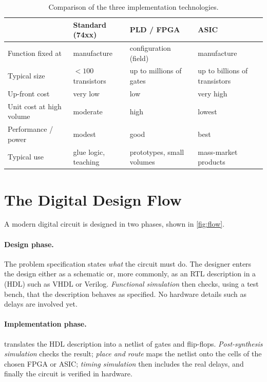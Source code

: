 \begin{table}[htbp]
\centering
\small
\caption{Comparison of the three implementation technologies.}
\label{tab:chiptypes}
\begin{tabularx}{\linewidth}{@{}lXXX@{}}
\toprule
 & \textbf{Standard (74xx)} & \textbf{PLD / FPGA} & \textbf{ASIC}\\
\midrule
Function fixed at & manufacture & configuration (field) & manufacture\\
Typical size & $<100$ transistors & up to millions of gates & up to billions of transistors\\
Up-front cost & very low & low & very high\\
Unit cost at high volume & moderate & high & lowest\\
Performance / power & modest & good & best\\
Typical use & glue logic, teaching & prototypes, small volumes & mass-market products\\
\bottomrule
\end{tabularx}
\end{table}

\section{The Digital Design Flow}\label{sec:flow}
A modern digital circuit is designed in two phases, shown in \cref{fig:flow}.

\paragraph{Design phase.} The problem specification states \emph{what} the circuit must do. The designer enters the design either as a schematic or, more commonly, as an RTL description in a  (HDL) such as VHDL or Verilog. \emph{Functional simulation} then checks, using a test bench, that the description behaves as specified. No hardware details such as delays are involved yet.

\paragraph{Implementation phase.}  translates the HDL description into a netlist of gates and flip-flops. \emph{Post-synthesis simulation} checks the result; \emph{place and route} maps the netlist onto the cells of the chosen FPGA or ASIC; \emph{timing simulation} then includes the real delays, and finally the circuit is verified in hardware.

